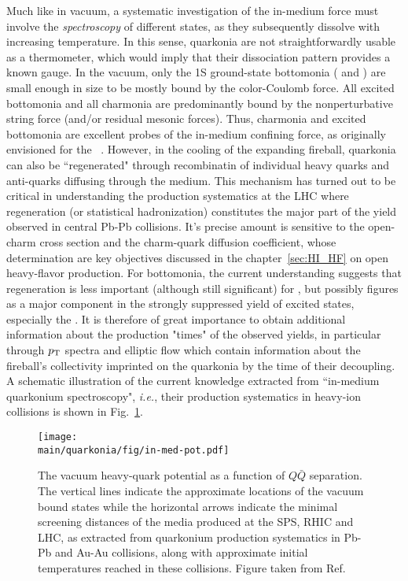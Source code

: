 \documentclass[../report.tex]{subfiles}
\providecommand{\main}{..}
\providecommand{\pt}{\ensuremath{p_\text{T}}\Xspace}
\begin{document}
Much like in vacuum, a systematic investigation of the in-medium force must involve the 
{\em spectroscopy} of different states, as they subsequently dissolve with increasing 
temperature. In this sense, quarkonia are not straightforwardly usable as a thermometer, 
which would imply that their dissociation pattern provides a known gauge. In the vacuum, 
only the 1S ground-state bottomonia ( and \PGhb) are small enough in size 
to be mostly bound by the color-Coulomb force. All excited bottomonia and all charmonia are 
predominantly bound by the nonperturbative string force (and/or residual mesonic forces). 
Thus, charmonia and excited bottomonia are excellent probes of the in-medium confining
force, as originally envisioned for the \PJgy~\cite{Matsui:1986dk}.
However, in the cooling of the expanding fireball, quarkonia can also be ``regenerated" 
through recombinatin of individual heavy quarks and anti-quarks diffusing through the medium. 
This mechanism has turned out to be critical in understanding the
\PJgy production systematics at the LHC where regeneration (or statistical hadronization) 
constitutes the major part of the yield observed in central Pb-Pb collisions. It's precise
amount is sensitive to the open-charm cross section and the charm-quark diffusion
coefficient, whose determination are key objectives discussed in the chapter~\ref{sec:HI_HF} on open 
heavy-flavor production. For bottomonia, the current understanding suggests that regeneration 
is less 
important (although still significant) for , but possibly figures as a
major component in the strongly suppressed yield of excited states, especially the 
. It is therefore of great importance to obtain additional information about
the production "times" of the observed yields, in particular through $\pt$ spectra
and elliptic flow which contain information about the fireball's collectivity imprinted
on the quarkonia by the time of their decoupling. A schematic illustration of the current knowledge
extracted from ``in-medium quarkonium spectroscopy", {\it i.e.}, their production systematics 
in heavy-ion collisions is shown in Fig.~\ref{fig_pot}.        
\begin{figure}[!h]
\begin{center}
\texttt{[image: \\main/quarkonia/fig/in-med-pot.pdf]}
\end{center}
\vspace{-0.5cm}
\caption{The vacuum heavy-quark potential as a function of $Q\bar Q$ separation. The vertical
lines indicate the approximate locations of the vacuum bound states while the horizontal arrows
indicate the minimal screening distances of the media produced at the SPS, RHIC and LHC, as 
extracted from quarkonium production systematics in Pb-Pb and Au-Au collisions, along with 
approximate initial temperatures reached in these collisions. 
Figure taken from Ref.~\cite{Rapp:2017chc}}
\label{fig_pot}
\end{figure}
\end{document}
